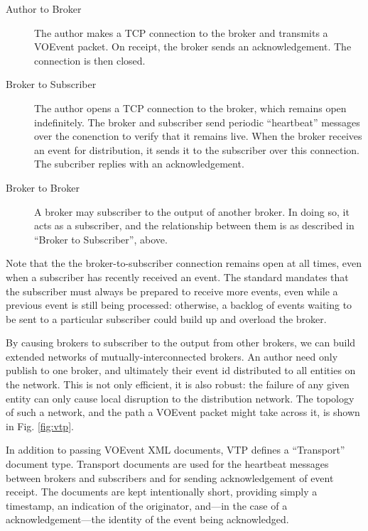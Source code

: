 \documentclass[5p,authoryear]{elsarticle}
\begin{document}
\begin{description}

  \item[Author to Broker]{The author makes a TCP connection to the broker and
  transmits a VOEvent packet. On receipt, the broker sends an acknowledgement.
  The connection is then closed.}

  \item[Broker to Subscriber]{The author opens a TCP connection to the broker,
  which remains open indefinitely. The broker and subscriber send periodic
  ``heartbeat'' messages over the conenction to verify that it remains live.
  When the broker receives an event for distribution, it sends it to the
  subscriber over this connection. The subcriber replies with an
  acknowledgement.}

  \item[Broker to Broker]{A broker may subscriber to the output of another
  broker. In doing so, it acts as a subscriber, and the relationship between
  them is as described in ``Broker to Subscriber'', above.}

\end{description}

Note that the the broker-to-subscriber connection remains open at all times,
even when a subscriber has recently received an event. The standard mandates
that the subscriber must always be prepared to receive more events, even while
a previous event is still being processed: otherwise, a backlog of events
waiting to be sent to a particular subscriber could build up and overload the
broker.

By causing brokers to subscriber to the output from other brokers, we can
build extended networks of mutually-interconnected brokers. An author need
only publish to one broker, and ultimately their event id distributed to all
entities on the network. This is not only efficient, it is also robust: the
failure of any given entity can only cause local disruption to the
distribution network. The topology of such a network, and the path a VOEvent
packet might take across it, is shown in Fig. \ref{fig:vtp}.

In addition to passing VOEvent XML documents, VTP defines a ``Transport''
document type. Transport documents are used for the heartbeat messages between
brokers and subscribers and for sending acknowledgement of event receipt. The
documents are kept intentionally short, providing simply a timestamp, an
indication of the originator, and---in the case of a acknowledgement---the
identity of the event being acknowledged.
\end{document}
